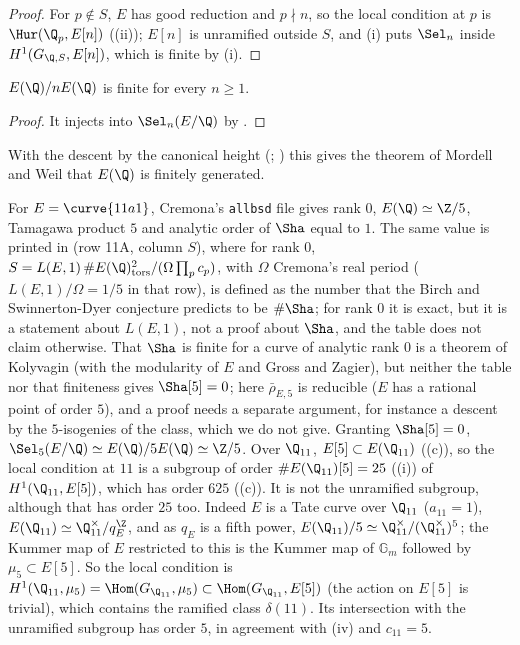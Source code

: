 \begin{proof}
For $p\notin S$, $E$ has good reduction and $p\nmid n$, so the local condition at $p$ is $\Hur(\Q_p,E[n])$ ((ii)); $E[n]$ is unramified outside $S$,
and (i) puts $\Sel_n$ inside $H^1(G_{\Q,S},E[n])$, which is finite by (i).
\end{proof}

\begin{corollary}\label{cor:galcoh:weak-mw}
$E(\Q)/nE(\Q)$ is finite for every $n\ge1$.
\end{corollary}

\begin{proof}
It injects into $\Sel_n(E/\Q)$ by .
\end{proof}

\noindent With the descent by the canonical height (; \cite[Chapter VIII]{SilvermanAEC}) this gives the theorem of Mordell and Weil that $E(\Q)$
is finitely generated.

\begin{example}[\curve{11a1} and $n=5$]\label{ex:galcoh:selmer-11a1}
For $E=\curve{11a1}$, Cremona's \texttt{allbsd} file gives rank $0$, $E(\Q)\simeq\Z/5$, Tamagawa product $5$ and analytic order of $\Sha$ equal to $1$. The same value
is printed in \cite[Table 4]{Cremona97} (row 11A, column $S$), where for rank $0$, $S=L(E,1)\,\#E(\Q)_{\mathrm{tors}}^2/(\Omega\prod_pc_p)$, with $\Omega$ Cremona's real period ($L(E,1)/\Omega=1/5$ in that row), is defined as the number that the Birch and
Swinnerton-Dyer conjecture predicts to be $\#\Sha$; for rank $0$ it is exact, but it is a statement about $L(E,1)$, not a proof about $\Sha$, and the table does not claim
otherwise. That $\Sha$ is finite for a curve of analytic rank $0$ is a theorem of Kolyvagin \cite{Kolyvagin90} (with the modularity of $E$ and Gross and Zagier), but neither the table nor that finiteness gives $\Sha[5]=0$; here $\bar\rho_{E,5}$ is
reducible ($E$ has a rational point of order $5$), and a proof needs a separate argument, for instance a descent by the $5$-isogenies of the class, which we do not give. Granting $\Sha[5]=0$,
$\Sel_5(E/\Q)\simeq E(\Q)/5E(\Q)\simeq\Z/5$. Over $\Q_{11}$, $E[5]\subset E(\Q_{11})$ ((c)), so the local condition at $11$ is a subgroup of order
$\#E(\Q_{11})[5]=25$ ((i)) of $H^1(\Q_{11},E[5])$, which has order $625$ ((c)). It is not the unramified subgroup, although that has order $25$
too. Indeed $E$ is a Tate curve over $\Q_{11}$ ($a_{11}=1$), $E(\Q_{11})\simeq\Q_{11}^\times/q_E^{\Z}$, and as $q_E$ is a fifth power,
$E(\Q_{11})/5\simeq\Q_{11}^\times/(\Q_{11}^\times)^5$; the Kummer map of $E$ restricted to this is the Kummer map of $\mathbb G_m$ followed by $\mu_5\subset E[5]$. So the local
condition is $H^1(\Q_{11},\mu_5)=\Hom(G_{\Q_{11}},\mu_5)\subset\Hom(G_{\Q_{11}},E[5])$ (the action on $E[5]$ is trivial), which contains the ramified class $\delta(11)$. Its
intersection with the unramified subgroup has order $5$, in agreement with (iv) and $c_{11}=5$.
\end{example}

